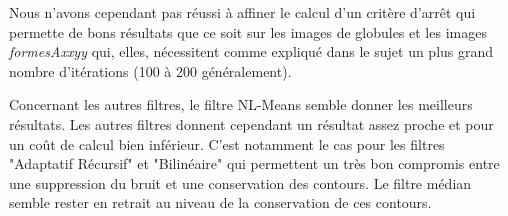 \documentclass[a4,12pt]{article}
\begin{document}
Nous n'avons cependant pas réussi à affiner le calcul d'un critère d'arrêt qui permette de bons résultats que ce soit sur les images de globules et les images \textit{formesAxxyy} qui, elles, nécessitent comme expliqué dans le sujet un plus grand nombre d'itérations (100 à 200 généralement).


Concernant les autres filtres, le filtre NL-Means semble donner les meilleurs résultats. Les autres filtres donnent cependant un résultat assez proche et pour un coût de calcul bien inférieur. C'est notamment le cas pour les filtres "Adaptatif Récursif" et "Bilinéaire" qui permettent un très bon compromis entre une suppression du bruit et une conservation des contours. Le filtre médian semble rester en retrait au niveau de la conservation de ces contours.

\end{document}
